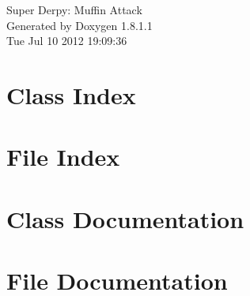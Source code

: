 \documentclass{book}
\begin{document}
\hypersetup{pageanchor=false,citecolor=blue}
\begin{titlepage}
\vspace*{7cm}
\begin{center}
{\Large Super Derpy\-: Muffin Attack }\\
\vspace*{1cm}
{\large Generated by Doxygen 1.8.1.1}\\
\vspace*{0.5cm}
{\small Tue Jul 10 2012 19:09:36}\\
\end{center}
\end{titlepage}
\clearemptydoublepage
{}
\tableofcontents
\clearemptydoublepage
{}
\hypersetup{pageanchor=true,citecolor=blue}
\chapter{Class Index}

\chapter{File Index}

\chapter{Class Documentation}













\chapter{File Documentation}






























\printindex
\end{document}
